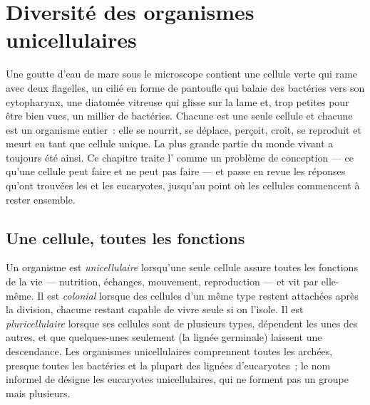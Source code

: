 \chapter{Diversité des organismes unicellulaires}\label{ch:b2:unicellular-diversity}

Une goutte d'eau de mare sous le microscope contient une cellule verte
qui rame avec deux flagelles, un cilié en forme de pantoufle qui balaie
des bactéries vers son cytopharynx, une diatomée vitreuse qui glisse sur
la lame et, trop petites pour être bien vues, un millier de bactéries.
Chacune est une seule cellule et chacune est un organisme entier~: elle
se nourrit, se déplace, perçoit, croît, se reproduit et meurt en tant
que cellule unique. La plus grande partie du monde vivant a toujours été
ainsi. Ce chapitre traite l' comme un problème de
conception --- ce qu'une cellule peut faire et ne peut pas faire --- et
passe en revue les réponses qu'ont trouvées les  et les
eucaryotes, jusqu'au point où les cellules commencent à rester ensemble.

\section{Une cellule, toutes les fonctions}

\begin{definition}\label{def:b2:unicellular-diversity:unicellular}
Un organisme est \emph{unicellulaire} lorsqu'une
seule cellule assure toutes les fonctions de la vie --- nutrition,
échanges, mouvement, reproduction --- et vit par elle-même. Il est
\emph{colonial} lorsque des cellules d'un même
type restent attachées après la division, chacune restant capable de
vivre seule si on l'isole. Il est \emph{pluricellulaire}
lorsque ses cellules sont de plusieurs types, dépendent les unes des
autres, et que quelques-unes seulement (la lignée germinale) laissent
une descendance. Les organismes unicellulaires comprennent toutes les
archées, presque toutes les bactéries et la plupart des lignées
d'eucaryotes~; le nom informel de \emph{} désigne les
eucaryotes unicellulaires, qui ne forment pas un groupe mais plusieurs.
\end{definition}

